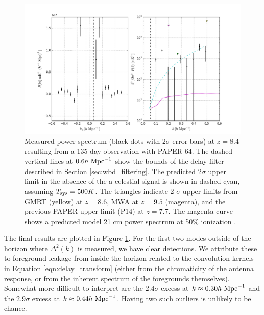 \documentclass[twocolumn,numberedappendix]{emulateapj} \shorttitle{New Limits on the 21 cm Power Spectrum at $z=8.4$}
\newcommand{\hMpci}{h\ {\rm Mpc}^{-1}}
\newcommand{\Tsys}{T_{\rm sys}}
\begin{document}
\begin{figure}\centering
\includegraphics[width=2\columnwidth]{plots/pk_k3pk.png}
\caption{
Measured power spectrum (black dots with 2$\sigma$ error bars) at $z=8.4$
resulting from a 135-day observation with PAPER-64.  The dashed vertical lines
at $0.6\hMpci$ show the bounds of the delay filter described in Section
\ref{sec:wbd_filtering}. The predicted 2$\sigma$ upper limit in the absence of the a celestial signal is shown in dashed cyan, assuming $\Tsys=500K$. The triangles indicate 2
$\sigma$ upper limits from GMRT \citep{paciga_et_al2011} (yellow) at $z=8.6$,
MWA \citep{dillon_et_al2013b} at $z=9.5$ (magenta), and the previous PAPER upper
limit (P14) at $z=7.7$. The magenta curve shows a predicted model 21 cm power
spectrum at 50\% ionization \citep{lidz_et_al2008}.
} \label{fig:final_pspec}
\end{figure}

The final results are plotted in Figure \ref{fig:final_pspec}.
For the first two modes outside of the horizon where $\Delta^2(k)$ is measured, we have
clear detections. We attribute these to foreground leakage from
inside the horizon related to the convolution kernels in Equation \eqref{eqn:delay_transform} (either
from the chromaticity of the antenna response, or from the inherent spectrum of the
foregrounds themselves).  Somewhat more difficult to interpret are the 
$2.4\sigma$ excess at $k\approx0.30\hMpci$ and 
the $2.9\sigma$ excess at $k\approx0.44\hMpci$. Having two such outliers is
unlikely to be chance.
\end{document}
